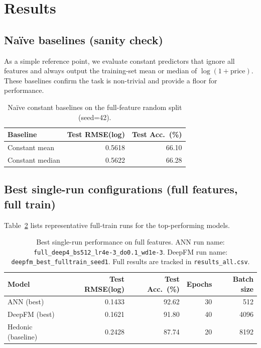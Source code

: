 \documentclass[11pt]{article}
\newcommand{\BestAnnRunName}{\texttt{full\_deep4\_bs512\_lr4e-3\_do0.1\_wd1e-3}}
\newcommand{\BestAnnTestRmse}{0.1433}
\newcommand{\BestAnnTestAcc}{92.62}
\newcommand{\BestDeepfmRunName}{\texttt{deepfm\_best\_fulltrain\_seed1}}
\newcommand{\BestDeepfmTestRmse}{0.1621}
\newcommand{\BestDeepfmTestAcc}{91.80}
\newcommand{\BestHedTestRmse}{0.2428}
\newcommand{\BestHedTestAcc}{87.74}
\newcommand{\NaiveMeanTestRmse}{0.5618}
\newcommand{\NaiveMeanTestAcc}{66.10}
\newcommand{\NaiveMedianTestRmse}{0.5622}
\newcommand{\NaiveMedianTestAcc}{66.28}
\begin{document}
\section{Results}\label{sec:results}
\subsection{Naïve baselines (sanity check)}
As a simple reference point, we evaluate constant predictors that ignore all features and always output the training-set mean or median of \(\log(1+\text{price})\). These baselines confirm the task is non-trivial and provide a floor for performance.

\begin{table}[h]
\centering
\small
\begin{tabular}{@{}lrr@{}}
\toprule
Baseline & Test RMSE(log) & Test Acc.\ (\%) \\
\midrule
Constant mean & \NaiveMeanTestRmse & \NaiveMeanTestAcc \\
Constant median & \NaiveMedianTestRmse & \NaiveMedianTestAcc \\
\bottomrule
\end{tabular}
\caption{Naïve constant baselines on the full-feature random split (seed=42).}
\label{tab:naive-baselines}
\end{table}

\subsection{Best single-run configurations (full features, full train)}
Table~\ref{tab:best-single} lists representative full-train runs for the top-performing models.

\begin{table}[h]
\centering
\begin{tabular}{@{}lrrrr@{}}
\toprule
Model & Test RMSE(log) & Test Acc.\ (\%) & Epochs & Batch size \\
\midrule
ANN (best) & \BestAnnTestRmse & \BestAnnTestAcc & 30 & 512 \\
DeepFM (best) & \BestDeepfmTestRmse & \BestDeepfmTestAcc & 40 & 4096 \\
Hedonic (baseline) & \BestHedTestRmse & \BestHedTestAcc & 20 & 8192 \\
\bottomrule
\end{tabular}
\caption{Best single-run performance on full features. ANN run name: \BestAnnRunName. DeepFM run name: \BestDeepfmRunName. Full results are tracked in \texttt{results\_all.csv}.}
\label{tab:best-single}
\end{table}
\end{document}
